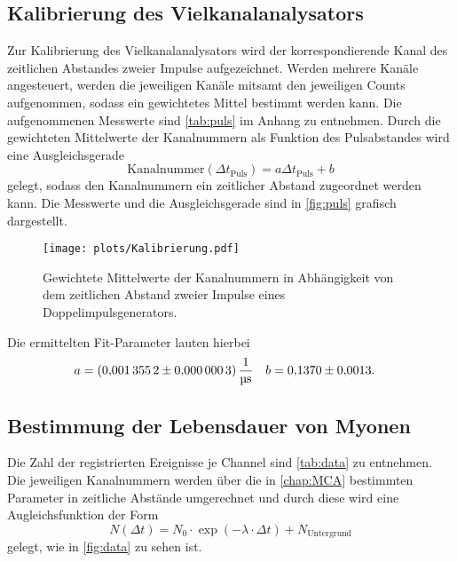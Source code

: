 \subsection{Kalibrierung des Vielkanalanalysators}\label{chap:MCA}
%
Zur Kalibrierung des Vielkanalanalysators wird der korrespondierende Kanal des zeitlichen Abstandes zweier Impulse aufgezeichnet. Werden mehrere Kanäle angesteuert, werden die jeweiligen Kanäle mitsamt den jeweiligen Counts aufgenommen, sodass ein gewichtetes Mittel bestimmt werden kann. Die aufgenommenen Messwerte sind \autoref{tab:puls} im Anhang zu entnehmen. Durch die gewichteten Mittelwerte der Kanalnummern als Funktion des Pulsabstandes wird eine Ausgleichsgerade
\begin{equation*}
  \mathrm{Kanalnummer} (\Delta t_\mathrm{Puls}) = a \Delta t_\mathrm{Puls} + b
\end{equation*}
gelegt, sodass den Kanalnummern ein zeitlicher Abstand zugeordnet werden kann. Die Messwerte und die Ausgleichsgerade sind in \autoref{fig:puls} grafisch dargestellt.

\begin{figure}[H]
  \centering
  \texttt{[image: plots/Kalibrierung.pdf]}
  \caption{Gewichtete Mittelwerte der Kanalnummern in Abhängigkeit von dem zeitlichen Abstand zweier Impulse eines Doppelimpulsgenerators.}
  \label{fig:puls}
\end{figure}

Die ermittelten Fit-Parameter lauten hierbei
\begin{align*}
  a &= \SI{0.0013552 \pm 0.0000003}{\per\micro\second} & b &= \num{0.137 \pm 0.0013}.
\end{align*}

\subsection{Bestimmung der Lebensdauer von Myonen}

Die Zahl der registrierten Ereignisse je Channel sind \autoref{tab:data} zu entnehmen. Die jeweiligen Kanalnummern werden über die in \autoref{chap:MCA} bestimmten Parameter in zeitliche Abstände umgerechnet und durch diese wird eine Augleichsfunktion der Form
\begin{equation*}
  N(\Delta t) = N_0 \cdot \exp (- \lambda \cdot \Delta t) + N_\mathrm{Untergrund}
\end{equation*}
gelegt, wie in \autoref{fig:data} zu sehen ist.

